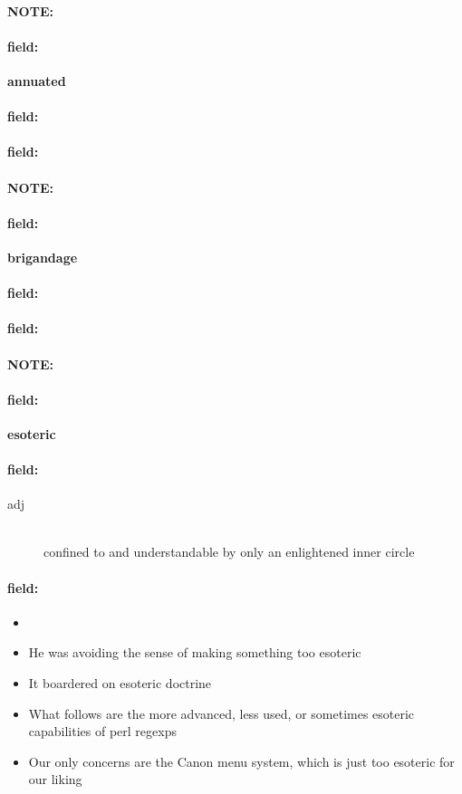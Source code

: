 \documentclass[12pt]{article}
\newenvironment{note}{\paragraph{NOTE:}}{}
\newenvironment{field}{\paragraph{field:}}{}
\begin{document}
\begin{note}
\begin{field}
\textbf{\large annuated}
\end{field}


\begin{field}
\end{field}

\begin{field}
\end{field}
\end{note}
\begin{note}
\begin{field}
\textbf{\large brigandage}
\end{field}


\begin{field}
\end{field}

\begin{field}
\end{field}
\end{note}
\begin{note}
\begin{field}
\textbf{\large esoteric}
\end{field}


\begin{field}
\begin{description}
\item[adj] \hfill \\ 
confined to and understandable by only an enlightened inner circle

\end{description}
\end{field}

\begin{field}
\begin{itemize}
\item 
\item He was avoiding the sense of making something too esoteric
\item It boardered on esoteric doctrine
\item What follows are the more advanced, less used, or sometimes esoteric capabilities of perl regexps
\item Our only concerns are the Canon menu system, which is just too esoteric for our liking
\end{itemize}
\end{field}
\end{note}
\end{document}
